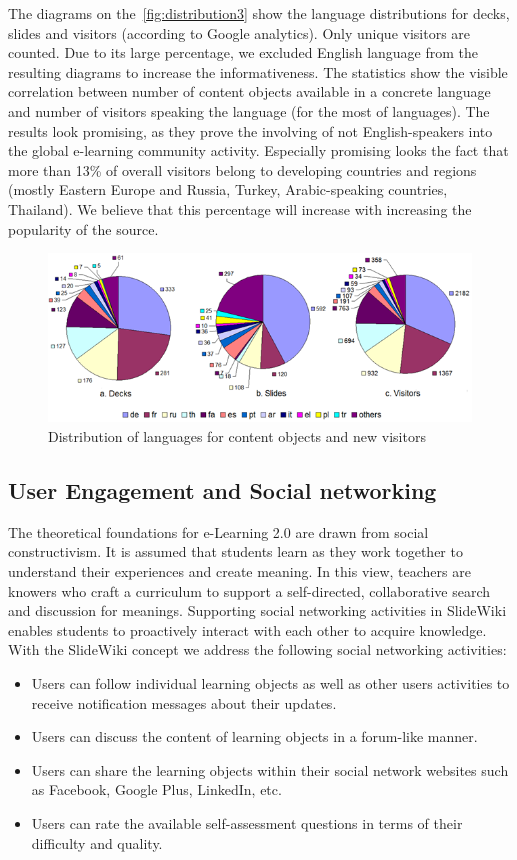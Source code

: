 \documentclass[ngerman,UKenglish,table]{scrbook}
\begin{document}
The diagrams on the~\autoref{fig:distribution3} show the language distributions for decks, slides and visitors (according to Google analytics).
Only unique visitors are counted.
Due to its large percentage, we excluded English language from the resulting diagrams to increase the informativeness. 
The statistics show the visible correlation between number of content objects available in a concrete language and number of visitors speaking the language (for the most of languages).
The results look promising, as they prove the involving of not English-speakers into the global e-learning community activity.
Especially promising looks the fact that more than 13\% of overall visitors belong to developing countries and regions (mostly Eastern Europe and Russia, Turkey, Arabic-speaking countries, Thailand).
We believe that this percentage will increase with increasing the popularity of the source.

\begin{figure}[!ht]
\centering
\includegraphics[width=1\textwidth]{Images/languages+visitors.png}
\caption{Distribution of languages for content objects and new visitors}
\label{fig:distribution3}
\end{figure}

 
\subsection{User Engagement and Social networking}
The theoretical foundations for e-Learning 2.0 are drawn from social constructivism.
It is assumed that students learn as they work together to understand their experiences and create meaning.
In this view, teachers are knowers who craft a curriculum to support a self-directed, collaborative search and discussion for meanings.
Supporting social networking activities in SlideWiki enables students to proactively interact with each other to acquire knowledge.
With the SlideWiki concept we address the following social networking activities:
\begin{itemize}
\item Users can follow individual learning objects as well as other users activities to receive notification messages about their updates.
\item Users can discuss the content of learning objects in a forum-like manner.
\item Users can share the learning objects within their social network websites such as Facebook, Google Plus, LinkedIn, etc.
\item Users can rate the available self-assessment questions in terms of their difficulty and quality.
\end{itemize}
\end{document}
